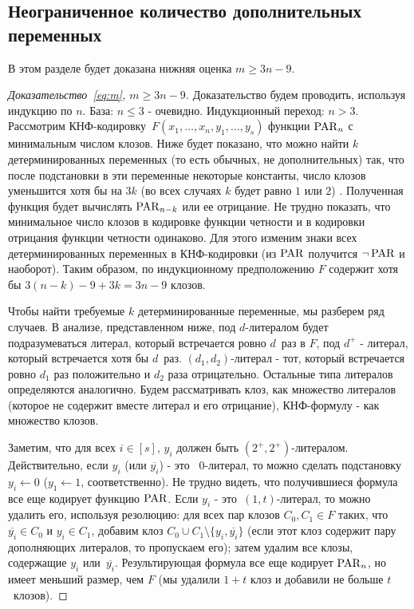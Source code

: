 \subsection{Неограниченное количество дополнительных переменных}
В этом разделе будет доказана нижняя оценка $m \ge 3n-9$.

\begin{proof}[Доказательство~\eqref{eq:m}, $m \ge 3n-9$]
	Доказательство будем проводить, используя индукцию по $n$.
	База: $n \le 3$ - очевидно.
	Индукционный переход: $n>3$. Рассмотрим КНФ-кодировку~$F(x_1, \dotsc, x_n, y_1, \dotsc, y_s)$ функции $\operatorname{PAR}_n$ с минимальным числом клозов. 
	Ниже будет показано, что можно найти $k$ детерминированных переменных (то есть обычных, не дополнительных) так, что после подстановки в эти переменные некоторые константы, число клозов уменьшится хотя бы на $3k$ (во всех случаях $k$ будет равно $1$ или $2$) . 
	Полученная функция будет вычислять $\operatorname{PAR}_{n-k}$ или ее отрицание.
	Не трудно показать, что минимальное число клозов в кодировке функции четности и в кодировки отрицания функции четности одинаково. Для этого изменим знаки всех детерминированных переменных в КНФ-кодировки (из $\operatorname{PAR}$ получится $\neg \operatorname{PAR}$ и наоборот).
	Таким образом, по индукционному предположению $F$ содержит хотя бы $3(n-k)-9+3k=3n-9$ клозов.

	Чтобы найти требуемые $k$ детерминированные переменные, мы разберем ряд случаев. В анализе, представленном ниже, под $d$-литералом будет подразумеваться литерал, который встречается ровно $d$~раз в $F$, под $d^+$ - литерал, который встречается хотя бы $d$~раз. $(d_1,d_2)$-литерал - тот, который встречается ровно $d_1$ раз положительно и $d_2$ раза отрицательно. Остальные типа литералов определяются аналогично. Будем рассматривать клоз, как множество литералов (которое не содержит вместе литерал и его отрицание), КНФ-формулу - как множество клозов.
	
	Заметим, что для всех $i \in [s]$, $y_i$ должен быть $(2^+,2^+)$-литералом. Действительно,
	если $y_i$ (или $\overline{y_i}$) - это ~$0$-литерал, то можно сделать подстановку $y_i \gets 0$
	($y_1 \gets 1$, соответственно). Не трудно видеть, что получившиеся формула все еще кодирует функцию $\operatorname{PAR}$. 
	Если $y_i$ - это~$(1,t)$-литерал, то можно 	
	удалить его, используя резолюцию: для всех пар клозов $C_0, C_1 \in F$ таких, что
	$\overline{y_i} \in C_0$ и $y_i \in C_1$, добавим клоз $C_0 \cup C_1 \setminus \{y_i, \overline{y_i}\}$ (если этот клоз содержит пару дополняющих литералов, то пропускаем его); затем удалим все клозы, содержащие $y_i$ или~$\overline{y_i}$. Результирующая формула все еще кодирует $\operatorname{PAR}_n$,
	но имеет меньший размер, чем $F$ (мы удалили $1+t$ клоз и добавили не больше $t$~клозов).
	

\end{proof}

